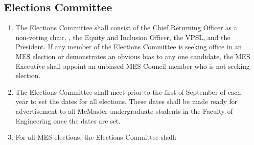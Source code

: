 \hypertarget{elections-committee}{%
 \subsection{Elections Committee}
 \label{elections-committee-guidelines}}
\begin{enumerate}
 \item
  The Elections Committee shall consist of the Chief Returning Officer
  as a non-voting chair, , the Equity and Inclusion Officer, the VPSL,
  and the President. If any member of the Elections Committee is seeking
  office in an MES election or demonstrates an obvious bias to any one
  candidate, the MES Executive shall appoint an unbiased MES Council
  member who is not seeking election.
 \item
  The Elections Committee shall meet prior to the first of September of
  each year to set the dates for all elections. These dates shall be
  made ready for advertisement to all McMaster undergraduate students in
  the Faculty of Engineering once the dates are set.
 \item
  For all MES elections, the Elections Committee shall:


\end{enumerate}
